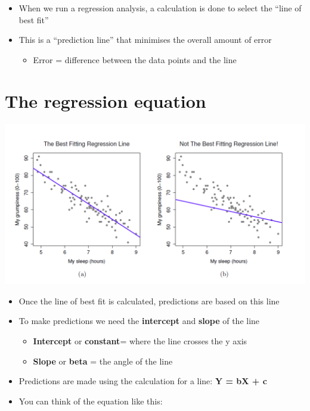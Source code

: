 \documentclass[
]{book}
\providecommand{\tightlist}{%
  \setlength{\itemsep}{0pt}\setlength{\parskip}{0pt}}
\begin{document}
\begin{itemize}
\tightlist
\item
  When we run a regression analysis, a calculation is done to select the ``line of best fit''
\item
  This is a ``prediction line'' that minimises the overall amount of error

  \begin{itemize}
  \tightlist
  \item
    Error = difference between the data points and the line
  \end{itemize}
\end{itemize}

\hypertarget{the-regression-equation}{%
\section{The regression equation}\label{the-regression-equation}}

\begin{center}\includegraphics[width=14.88in]{img/bestfit} \end{center}

\begin{itemize}
\item
  Once the line of best fit is calculated, predictions are based on this line
\item
  To make predictions we need the \textbf{intercept} and \textbf{slope} of the line

  \begin{itemize}
  \tightlist
  \item
    \textbf{Intercept} or \textbf{constant}= where the line crosses the y axis
  \item
    \textbf{Slope} or \textbf{beta} = the angle of the line
  \end{itemize}
\item
  Predictions are made using the calculation for a line:
  \textbf{Y = bX + c}
\item
  You can think of the equation like this:
\end{itemize}
\end{document}
